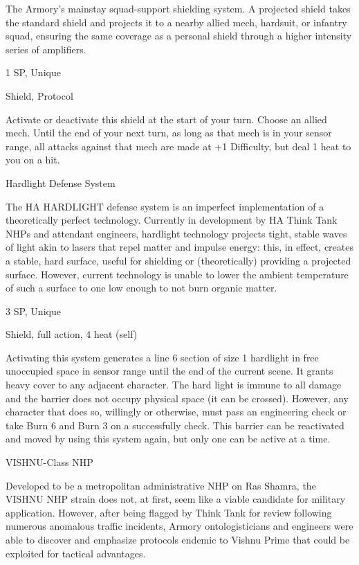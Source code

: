 \begin{mech}
The Armory’s mainstay squad-support shielding system. A projected shield takes the standard shield and projects it to a nearby allied mech, hardsuit, or infantry squad, ensuring the same coverage as a personal shield through a higher intensity series of amplifiers.

1 SP, Unique

Shield, Protocol

Activate or deactivate this shield at the start of your turn. Choose an allied mech. Until the end of your next turn, as long as that mech is in your sensor range, all attacks against that mech are made at +1 Difficulty, but deal 1 heat to you on a hit.


Hardlight Defense System

The HA HARDLIGHT defense system is an imperfect implementation of a theoretically perfect technology. Currently in development by HA Think Tank NHPs and attendant engineers, hardlight technology projects tight, stable waves of light akin to lasers that repel matter and impulse energy: this, in effect, creates a stable, hard surface, useful for shielding or (theoretically) providing a projected surface. However, current technology is unable to lower the ambient temperature of such a surface to one low enough to not burn organic matter.

3 SP, Unique

Shield, full action, 4 heat (self)

Activating this system generates a line 6 section of size 1 hardlight in free unoccupied space in sensor range until the end of the current scene. It grants heavy cover to any adjacent character. The hard light is immune to all damage and the barrier does not occupy physical space (it can be crossed). However, any character that does so, willingly or otherwise, must pass an engineering check or take Burn 6 and Burn 3 on a successfully check. This barrier can be reactivated and moved by using this system again, but only one can be active at a time.


VISHNU-Class NHP

Developed to be a metropolitan administrative NHP on Ras Shamra, the VISHNU NHP strain does not, at first, seem like a viable candidate for military application. However, after being flagged by Think Tank for review following numerous anomalous traffic incidents, Armory ontologisticians and engineers were able to discover and emphasize protocols endemic to Vishnu Prime that could be exploited for tactical advantages.


\end{mech}
